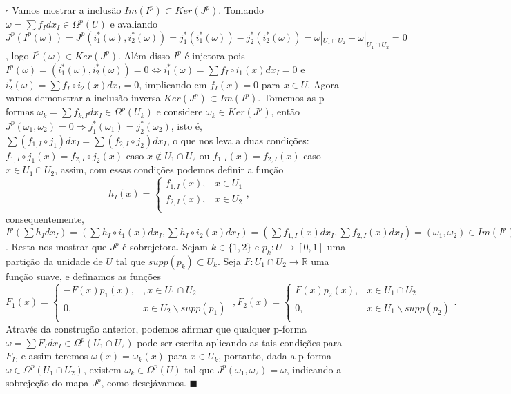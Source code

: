 \documentclass{article}
\begin{document}
	$\square$ Vamos mostrar a inclusão $Im(I^{p}) \subset Ker(J^{p})$. Tomando $\omega = \sum f_{I}dx_{I} \in \Omega^{p}(U)$ e avaliando $J^{p}(I^{p}(\omega)) = J^{p}(i^{*}_{1}(\omega), i^{*}_{2}(\omega)) = j^{*}_{1}(i^{*}_{1}(\omega))- j^{*}_{2}(i^{*}_{2}(\omega)) = \omega|_{U_{1} \cap U_{2}} - \omega|_{U_{1} \cap U_{2}} = 0$, logo $I^{p}(\omega) \in Ker(J^{p})$. Além disso $I^{p}$ é injetora pois $I^{p}(\omega) = (i^{*}_{1}(\omega), i^{*}_{2}(\omega)) = 0 \iff i^{*}_{1}(\omega)=\sum f_{I}\circ i_{1}(x) dx_{I} = 0$ e $i^{*}_{2}(\omega) = \sum f_{I}\circ i_{2}(x) dx_{I} = 0$, implicando em $f_{I}(x) = 0$ para $x \in U$.  Agora vamos demonstrar a inclusão inversa $Ker(J^{p})\subset Im(I^{p})$. Tomemos as p-formas $\omega_{k} = \sum f_{k,I} dx_{I} \in \Omega^{p}(U_{k})$ e considere $\omega_{k} \in Ker(J^{p})$, então $J^{p}(\omega_{1}, \omega_{2}) = 0 \Rightarrow j^{*}_{1}(\omega_{1}) = j^{*}_{2}(\omega_{2})$, isto é, $\sum (f_{1,I}\circ j_{1}) dx_{I} = \sum (f_{2,I}\circ j_{2}) dx_{I}$, o que nos leva a duas condições: $f_{1,I}\circ j_{1}(x) = f_{2,I}\circ j_{2}(x)$ caso $x \notin U_{1} \cap U_{2}$ ou $f_{1,I}(x) = f_{2,I}(x)$ caso $x \in U_{1} \cap U_{2}$, assim, com essas condições podemos definir a função 
	$$
	h_{I}(x) = \left\{
	\begin{array}{cc}
	f_{1,I}(x), & x \in U_{1} \\
	f_{2,I}(x), & x \in U_{2} \\
	\end{array},
	\right.
	$$
	consequentemente, $I^{p}(\sum h_{I}dx_{I}) = (\sum h_{I}\circ i_{1}(x)dx_{I}, \sum h_{I}\circ i_{2}(x)dx_{I}) = (\sum f_{1,I}(x)dx_{I}, \sum f_{2,I}(x)dx_{I}) = (\omega_{1}, \omega_{2}) \in Im(I^{p})$. Resta-nos mostrar que $J^{p}$ é sobrejetora. Sejam $k \in \{1,2\}$ e $p_{k}: U \to [0,1]$ uma partição da unidade de $U$ tal que $supp(p_{k}) \subset U_{k}$. Seja $F: U_{1} \cap U_{2} \to \mathbb{R}$ uma função suave, e definamos as funções
	$$
	F_{1}(x) = \left\{
	\begin{array}{cc}
	-F(x)p_{1}(x), &, x \in U_{1} \cap U_{2} \\
	0, & x \in U_{2}\backslash supp(p_{1})\\
	\end{array}
	\right.
	\; ,F_{2}(x) = \left\{
	\begin{array}{cc}
	F(x)p_{2}(x), & x \in U_{1} \cap U_{2} \\
	0, & x \in U_{1}\backslash supp(p_{2}) \\
	\end{array}.
	\right.
	$$ 
	Através da construção anterior, podemos afirmar que qualquer p-forma $\omega = \sum F_{I}dx_{I} \in \Omega^{p}( U_{1} \cap U_{2})$ pode ser escrita aplicando as tais condições para $F_{I}$, e assim teremos $\omega(x) = \omega_{k}(x)$ para $x \in U_{k}$, portanto, dada a p-forma $\omega \in \Omega^{p}( U_{1} \cap U_{2})$, existem $\omega_{k} \in \Omega^{p}(U)$ tal que $J^{p}(\omega_{1}, \omega_{2}) = \omega$, indicando a sobrejeção do mapa $J^{p}$, como desejávamos. $\blacksquare$
	
\end{document}
